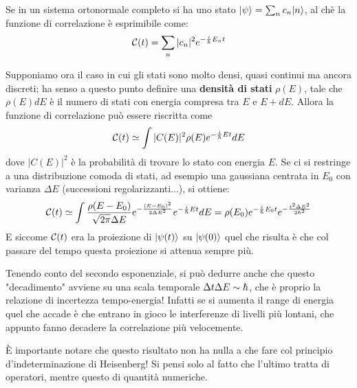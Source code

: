 Se in un sistema ortonormale completo si ha uno stato $\Ket \psi = \sum_n c_n\Ket n$, al chè la funzione di correlazione è esprimibile come:
\[
	\Co(t) = \sum_n |c_n|^2 e^{-\frac{i}{\hslash} E_n t}
\]

Supponiamo ora il caso in cui gli stati sono molto densi, quasi continui ma ancora discreti; ha senso a questo punto definire una \textbf{densità di stati} $\rho(E)$, tale che $\rho(E) dE$ è il numero di stati con energia compresa tra $E$ e $E + dE$. Allora la funzione di correlazione può essere riscritta come
\[
	\Co(t) \simeq \int |C(E)|^2 \rho(E) e^{-\frac{i}{\hslash} E t} dE
\]
dove $|C(E)|^2$ è la probabilità di trovare lo stato con energia $E$. Se ci si restringe a una distribuzione comoda di stati, ad esempio una gaussiana centrata in $E_0$ con varianza $\Delta E$ (successioni regolarizzanti...), si ottiene:
\[
	\Co(t) \simeq \int \frac{\rho(E - E_0)}{\sqrt{2 \pi} \Delta E} e^{-\frac{(E - E_0)^2}{2 \Delta E^2}} e^{-\frac{i}{\hslash} E t} dE = \rho(E_0)e^{-\frac{i}{\hslash} E_0 t} e^{-\frac{t^2 \Delta E^2}{2 \hslash^2}}
\]
E siccome $\Co(t)$ era la proiezione di $\Ket {\psi(t)}$ su $\Ket{\psi(0)}$ quel che risulta è che col passare del tempo questa proiezione si attenua sempre più.

Tenendo conto del secondo esponenziale, si può dedurre anche che questo "decadimento" avviene su una scala temporale $\Delta t \Delta E \sim \h$, che è proprio la relazione di incertezza tempo-energia! Infatti se si aumenta il range di energia quel che accade è che entrano in gioco le interferenze di livelli più lontani, che appunto fanno decadere la correlazione più velocemente.
\tab

È importante notare che questo risultato non ha nulla a che fare col principio d'indeterminazione di Heisenberg! Si pensi solo al fatto che l'ultimo tratta di operatori, mentre questo di quantità numeriche.